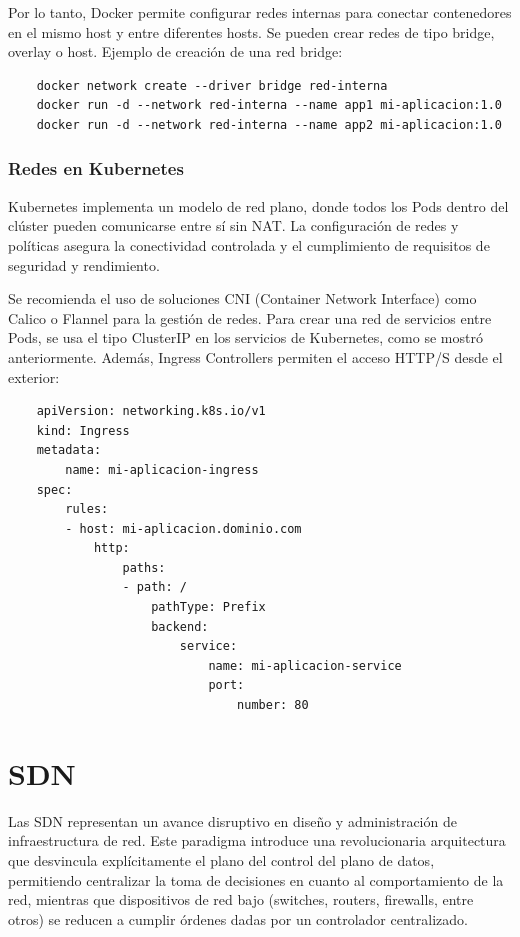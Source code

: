 {                Por lo tanto,  Docker permite configurar redes internas para conectar contenedores en el mismo host y entre diferentes hosts. Se pueden crear redes de tipo bridge, overlay o host. Ejemplo de creación de una red bridge:
            
                \begin{verbatim}
    docker network create --driver bridge red-interna
    docker run -d --network red-interna --name app1 mi-aplicacion:1.0
    docker run -d --network red-interna --name app2 mi-aplicacion:1.0
                \end{verbatim}
            
            \subsubsection{Redes en Kubernetes}
                Kubernetes implementa un modelo de red plano, donde todos los Pods dentro del clúster pueden comunicarse entre sí  sin NAT. La configuración de redes y políticas asegura la conectividad controlada y el cumplimiento de requisitos de seguridad y rendimiento.
                
                Se recomienda el uso de soluciones CNI (Container Network Interface) como Calico o Flannel para la gestión de redes. Para crear una red de servicios entre Pods, se usa el tipo ClusterIP en los servicios de Kubernetes, como se mostró anteriormente. Además, Ingress Controllers permiten el acceso HTTP/S desde el exterior:
            
                \begin{verbatim}
    apiVersion: networking.k8s.io/v1
    kind: Ingress
    metadata:
        name: mi-aplicacion-ingress
    spec:
        rules:
        - host: mi-aplicacion.dominio.com
            http:
                paths:
                - path: /
                    pathType: Prefix
                    backend:
                        service:
                            name: mi-aplicacion-service
                            port:
                                number: 80
                \end{verbatim}
    \section{SDN}            
        Las SDN representan un avance disruptivo en diseño y administración de infraestructura de red. Este paradigma introduce una revolucionaria arquitectura que desvincula explícitamente el plano del control del plano de datos, permitiendo centralizar la toma de decisiones en cuanto al comportamiento de la red, mientras que dispositivos de red bajo (switches, routers, firewalls, entre otros) se reducen a cumplir órdenes dadas por un controlador centralizado.

}
